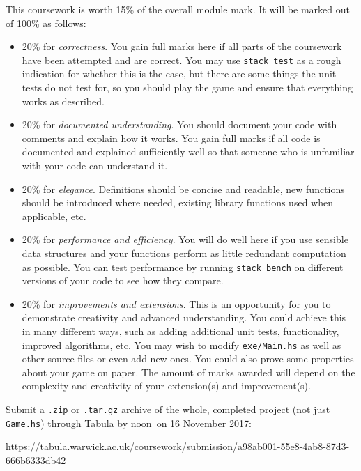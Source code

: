 \documentclass{cs256-shared/cs256}
\newcommand{\deadlineTime}{noon}
\newcommand{\deadlineDate}{16 November 2017}
\newcommand{\submissionURL}{https://tabula.warwick.ac.uk/coursework/submission/a98ab001-55e8-4ab8-87d3-666b6333db42}
\begin{document}
This coursework is worth 15\% of the overall module mark. It will be marked out of 100\% as follows:
\begin{itemize}
\item 20\% for \emph{correctness}. You gain full marks here if all parts of the coursework have been attempted and are correct. You may use \texttt{stack test} as a rough indication for whether this is the case, but there are some things the unit tests do not test for, so you should play the game and ensure that everything works as described.
\item 20\% for \emph{documented understanding}. You should document your code with comments and explain how it works. You gain full marks if all code is documented and explained sufficiently well so that someone who is unfamiliar with your code can understand it.
\item 20\% for \emph{elegance}. Definitions should be concise and readable, new functions should be introduced where needed, existing library functions used when applicable, etc. 
\item 20\% for \emph{performance and efficiency}. You will do well here if you use sensible data structures and your functions perform as little redundant computation as possible. You can test performance by running \texttt{stack bench} on different versions of your code to see how they compare. 
\item 20\% for \emph{improvements and extensions}. This is an opportunity for you to demonstrate creativity and advanced understanding. You could achieve this in many different ways, such as adding additional unit tests, functionality, improved algorithms, etc. You may wish to modify \texttt{exe/Main.hs} as well as other source files or even add new ones. You could also prove some properties about your game on paper. The amount of marks awarded will depend on the complexity and creativity of your extension(s) and improvement(s).
\end{itemize}
Submit a \texttt{.zip} or \texttt{.tar.gz} archive of the whole, completed project (not just \texttt{Game.hs}) through Tabula by \deadlineTime\ on \deadlineDate:
\begin{center} 
	\url{\submissionURL}
\end{center}
\end{document}
